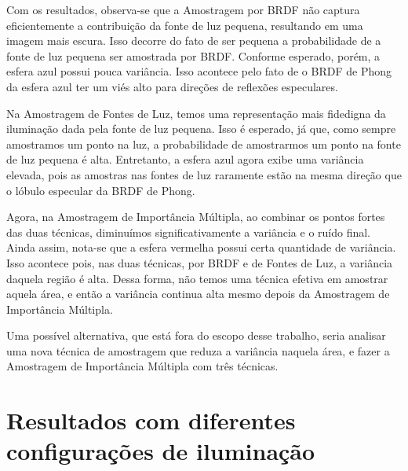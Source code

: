 Com os resultados, observa-se que a Amostragem por BRDF não captura
eficientemente a contribuição da fonte de luz pequena, resultando em uma imagem
mais escura. Isso decorre do fato de ser pequena a probabilidade de a fonte de
luz pequena ser amostrada por BRDF. Conforme esperado, porém, a esfera azul
possui pouca variância. Isso acontece pelo fato de o BRDF de Phong da esfera
azul ter um viés alto para direções de reflexões especulares.

Na Amostragem de Fontes de Luz, temos uma representação mais fidedigna da
iluminação dada pela fonte de luz pequena. Isso é esperado, já que, como sempre
amostramos um ponto na luz, a probabilidade de amostrarmos um ponto na fonte de
luz pequena é alta. Entretanto, a esfera azul agora exibe uma variância
elevada, pois as amostras nas fontes de luz raramente estão na mesma direção
que o lóbulo especular da BRDF de Phong.

Agora, na Amostragem de Importância Múltipla, ao combinar os pontos fortes das
duas técnicas, diminuímos significativamente a variância e o ruído final. Ainda
assim, nota-se que a esfera vermelha possui certa quantidade de variância. Isso
acontece pois, nas duas técnicas, por BRDF e de Fontes de Luz, a variância
daquela região é alta. Dessa forma, não temos uma técnica efetiva em
amostrar aquela área, e então a variância continua alta mesmo depois da
Amostragem de Importância Múltipla.

Uma possível alternativa, que está fora do escopo desse trabalho, seria
analisar uma nova técnica de amostragem que reduza a variância naquela área, e
fazer a Amostragem de Importância Múltipla com três técnicas.

\section{Resultados com diferentes configurações de iluminação}

